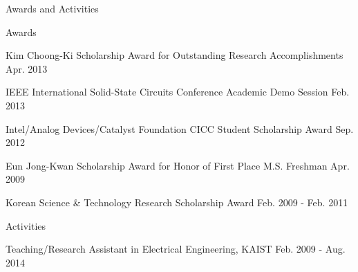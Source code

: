 \documentclass{resume} %
\begin{document}
\begin{section}{Awards and Activities}

\begin{subsection}{Awards}{}{}{}
\item Kim Choong-Ki Scholarship Award for Outstanding Research Accomplishments \hfill Apr. 2013
\item IEEE International Solid-State Circuits Conference Academic Demo Session \hfill Feb. 2013
\item Intel/Analog Devices/Catalyst Foundation CICC Student Scholarship Award \hfill Sep. 2012
\item Eun Jong-Kwan Scholarship Award for Honor of First Place M.S. Freshman \hfill Apr. 2009
\item Korean Science \& Technology Research Scholarship Award \hfill Feb. 2009 - Feb. 2011
\end{subsection}

\begin{subsection}{Activities}{}{}{}
\item Teaching/Research Assistant in Electrical Engineering, KAIST \hfill Feb. 2009 - Aug. 2014
\end{subsection}

\end{section}
\end{document}
